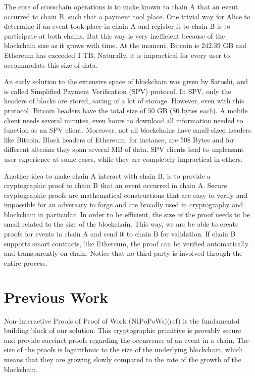The core of crosschain operations is to make known to chain A that an event
occurred to chain B, such that a payment tool place. One trivial way for Alice
to determine if an event took place in chain A and register it to chain B is to
participate at both chains. But this way is very inefficient because of the
blockchain size as it grows with time. At the moment, Bitcoin is 242.39 GB and
Ethereum has exceeded 1 TB. Naturally, it is impractical for every user to
accommodate this size of data.

An early solution to the extensive space of blockchain was given by Satoshi,
and is called Simplified Payment Verification (SPV) protocol. In SPV, only the
headers of blocks are stored, saving of a lot of storage. However, even with
this protocol, Bitcoin headers have the total size of 50 GB (80 bytes each). A
mobile client needs several minutes, even hours to download all information
needed to function as an SPV client. Moreover, not all blockchains have
small-sized headers like Bitcoin. Block headers of Ethereum, for instance, are
508 Bytes and for different altcoins they span several MB of data. SPV clients
lead to unpleasant user experience at some cases, while they are completely
impractical in others.

Another idea to make chain A interact with chain B, is to provide a
cryptographic proof to chain B that an event occurred in chain A. Secure
cryptographic proofs are mathematical constructions that are easy to verify and
impossible for an adversary to forge and are broadly used in cryptography and
blockchain in particular. In order to be efficient, the size of the proof needs
to be small related to the size of the blockchain. This way, we are be able to
create proofs for events in chain A and send it to chain B for validation.  If
chain B supports smart contracts, like Ethereum, the proof can be verified
automatically and transparently on-chain. Notice that no third-party is
involved through the entire process.

\section{Previous Work}

Non-Interactive Proofs of Proof of Work (NIPoPoWs)(ref) is the fundamental
building block of our solution. This cryptographic primitive is provably secure
and provide succinct proofs regarding the occurrence of an event in a chain.
The size of the proofs is logarithmic to the size of the underlying blockchain,
which means that they are growing slowly compared to the rate of the growth of
the blockchain.

